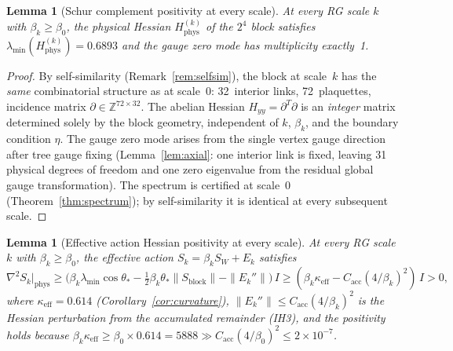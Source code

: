 \documentclass[11pt]{article}
\newtheorem{lemma}[theorem]{Lemma}
\theoremstyle{definition}
\newcommand{\Z}{\mathbb{Z}}
\begin{document}
\begin{lemma}[Schur complement positivity at every scale]%
\label{lem:schur-every-scale}
At every RG scale $k$ with $\beta_k\ge\beta_0$, the physical
Hessian $H_{\mathrm{phys}}^{(k)}$ of the $2^4$ block satisfies
$\lambda_{\min}(H_{\mathrm{phys}}^{(k)})=0.6893$ and the
gauge zero mode has multiplicity exactly~1.
\end{lemma}

\begin{proof}
By self-similarity (Remark~\ref{rem:selfsim}), the block at
scale~$k$ has the \emph{same} combinatorial structure as at
scale~0: 32~interior links, 72~plaquettes, incidence matrix
$\partial\in\Z^{72\times 32}$.  The abelian Hessian
$H_{yy}=\partial^T\partial$ is an \emph{integer} matrix
determined solely by the block geometry, independent of $k$,
$\beta_k$, and the boundary condition $\eta$.
The gauge zero mode arises from the single vertex gauge
direction after tree gauge fixing
(Lemma~\ref{lem:axial}: one interior link is fixed,
leaving 31 physical degrees of freedom and one zero eigenvalue
from the residual global gauge transformation).
The spectrum is certified at scale~0
(Theorem~\ref{thm:spectrum}); by self-similarity it is
identical at every subsequent scale.
\end{proof}

\begin{lemma}[Effective action Hessian positivity at every scale]%
\label{lem:eff-hessian}
At every RG scale $k$ with $\beta_k\ge\beta_0$, the effective
action $S_k=\beta_k S_W+E_k$ satisfies
\begin{equation}
\nabla^2 S_k\big|_{\mathrm{phys}}
\ge\bigl(\beta_k\lambda_{\min}\cos\theta_*
-\tfrac{1}{2}\beta_k\theta_*\|S_{\mathrm{block}}\|
-\|E_k''\|\bigr)\,I
\ge(\beta_k\kappa_{\mathrm{eff}}-C_{\mathrm{acc}}(4/\beta_k)^2)\,I
>0,
\end{equation}
where $\kappa_{\mathrm{eff}}=0.614$ (Corollary~\ref{cor:curvature}),
$\|E_k''\|\le C_{\mathrm{acc}}(4/\beta_k)^2$
is the Hessian perturbation from the accumulated remainder
(IH3), and the positivity holds because
$\beta_k\kappa_{\mathrm{eff}}\ge\beta_0\times 0.614=5888
\gg C_{\mathrm{acc}}(4/\beta_0)^2\le 2\times 10^{-7}$.
\end{lemma}
\end{document}
